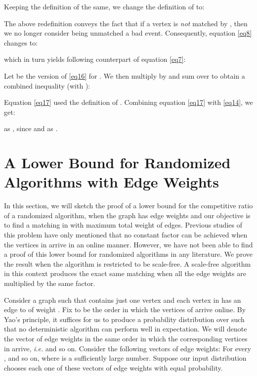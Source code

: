 \documentclass[11pt]{article}
\begin{document}
Keeping the definition of  the same, we change the definition of  to:


The above redefinition conveys the fact that if a vertex  is \emph{not} matched by , then we no longer consider  being unmatched a bad event. Consequently, equation \eqref{eq8} changes to:

 which in turn yields following counterpart of equation \eqref{eq7}:



Let  be the version of \eqref{eq16} for . We then multiply  by  and sum over  to obtain a combined inequality (with ):



Equation \eqref{eq17} used the definition of . Combining equation \eqref{eq17} with \eqref{eq14}, we get:



as , since  and  as .

\section{A Lower Bound for Randomized Algorithms with Edge Weights}
\label{app4}


In this section, we will sketch the proof of a lower bound for the competitive ratio of a randomized algorithm, when the graph  has edge weights and our objective is to find a matching in  with maximum total weight of edges. Previous studies of this problem have only mentioned that no constant factor can be achieved when the vertices in  arrive in an online manner. However, we have not been able to find a proof of this lower bound for randomized algorithms in any literature. We prove the result when the algorithm is restricted to be scale-free. A scale-free algorithm in this context produces the exact same matching when all the edge weights are multiplied by the same factor.

Consider a graph  such that  contains just one vertex  and each vertex in  has an edge to  of weight . Fix  to be the order in which the vertices of  arrive online. By Yao's principle, it suffices for us to produce a probability distribution over  such that no deterministic algorithm can perform well in expectation. We will denote the vector of edge weights in the same order in which the corresponding vertices in  arrive, \textit{i.e.}  and so on. Consider the following  vectors of edge weights: For every ,  and so on, where  is a sufficiently large number. Suppose our input distribution chooses each one of these  vectors of edge weights with equal probability.
\end{document}
